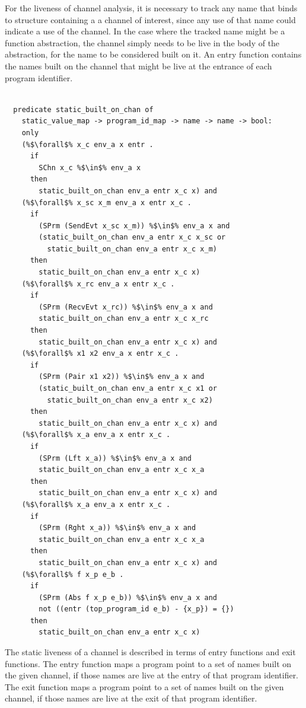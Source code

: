 \documentclass{article}
\begin{document}
For the liveness of channel analysis, it is necessary to track any name that binds to structure
containing a a channel of interest, since any use of that name could indicate a use of the
channel. In the case where the tracked name might be a function abstraction, the channel simply
needs to be live in the body of the abstraction, for the name to be considered built on it.
An entry function contains the names built on the channel that might be live at the entrance
of each program identifier.

\begin{lstlisting}[language=logic, escapechar=\%]

  predicate static_built_on_chan of
    static_value_map -> program_id_map -> name -> name -> bool:
    only
    (%$\forall$% x_c env_a x entr .
      if 
        SChn x_c %$\in$% env_a x 
      then 
        static_built_on_chan env_a entr x_c x) and
    (%$\forall$% x_sc x_m env_a x entr x_c . 
      if
        (SPrm (SendEvt x_sc x_m)) %$\in$% env_a x and
        (static_built_on_chan env_a entr x_c x_sc or
          static_built_on_chan env_a entr x_c x_m)
      then 
        static_built_on_chan env_a entr x_c x)
    (%$\forall$% x_rc env_a x entr x_c . 
      if  
        (SPrm (RecvEvt x_rc)) %$\in$% env_a x and
        static_built_on_chan env_a entr x_c x_rc
      then 
        static_built_on_chan env_a entr x_c x) and
    (%$\forall$% x1 x2 env_a x entr x_c . 
      if  
        (SPrm (Pair x1 x2)) %$\in$% env_a x and
        (static_built_on_chan env_a entr x_c x1 or
          static_built_on_chan env_a entr x_c x2)
      then 
        static_built_on_chan env_a entr x_c x) and
    (%$\forall$% x_a env_a x entr x_c .
      if
        (SPrm (Lft x_a)) %$\in$% env_a x and
        static_built_on_chan env_a entr x_c x_a
      then 
        static_built_on_chan env_a entr x_c x) and
    (%$\forall$% x_a env_a x entr x_c .
      if
        (SPrm (Rght x_a)) %$\in$% env_a x and
        static_built_on_chan env_a entr x_c x_a
      then 
        static_built_on_chan env_a entr x_c x) and
    (%$\forall$% f x_p e_b .
      if
        (SPrm (Abs f x_p e_b)) %$\in$% env_a x and
        not ((entr (top_program_id e_b) - {x_p}) = {})
      then
        static_built_on_chan env_a entr x_c x)
  \end{lstlisting}


The static liveness of a channel is described in terms of entry functions and
exit functions. The entry function maps a program point to a set of names built on
the given channel, if those names are live at the entry of that program identifier.
The exit function maps a program point to a
set of names built on the given channel, if those names are live at the exit of that
program identifier.
\end{document}
